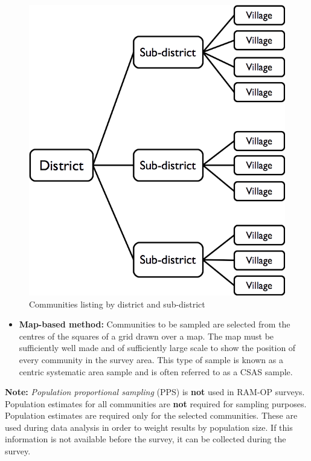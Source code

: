 \documentclass[12pt,a4paper]{book}
\providecommand{\tightlist}{%
  \setlength{\itemsep}{0pt}\setlength{\parskip}{0pt}}
\theoremstyle{definition}
\theoremstyle{definition}
\theoremstyle{definition}
\theoremstyle{remark}
\begin{document}
\begin{figure}[H]

{\centering \includegraphics{figures/listSample1} 

}

\caption{Communities listing by district and sub-district}\label{fig:sample1}
\end{figure}

\begin{itemize}
\tightlist
\item
  \textbf{Map-based method:} Communities to be sampled are selected from
  the centres of the squares of a grid drawn over a map. The map must be
  sufficiently well made and of sufficiently large scale to show the
  position of every community in the survey area. This type of sample is
  known as a centric systematic area sample and is often referred to as
  a CSAS sample.
\end{itemize}

\textbf{Note:} \emph{Population proportional sampling} (PPS) is
\textbf{not} used in RAM-OP surveys. Population estimates for all
communities are \textbf{not} required for sampling purposes. Population
estimates are required only for the selected communities. These are used
during data analysis in order to weight results by population size. If
this information is not available before the survey, it can be collected
during the survey.
\end{document}
